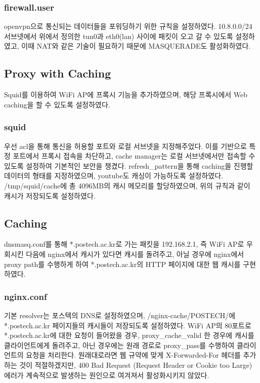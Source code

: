 \documentclass{article}
\begin{document}
    \subsubsection{firewall.user}
    openvpn으로 통신되는 데이터들을 포워딩하기 위한 규칙을 설정하였다. 10.8.0.0/24 서브넷에서 위에서 정의한 tun0과 eth0(lan) 사이에 패킷이 오고 갈 수 있도록 설정하였고,
    이때 NAT와 같은 기술이 필요하기 때문에 MASQUERADE도 활성화하였다.

    \subsection{Proxy with Caching}
    Squid를 이용하여 WiFi AP에 프록시 기능을 추가하였으며, 해당 프록시에서 Web caching을 할 수 있도록 설정하였다.
    \subsubsection{squid}
    우선 acl을 통해 통신을 허용할 포트와 로컬 서브넷을 지정해주었다.
    이를 기반으로 특정 포트에서 프록시 접속을 차단하고, cache manager는 로컬 서브넷에서만 접속할 수 있도록 설정하여 기본적인 보안을 챙겼다.
    refresh\_pattern을 통해 caching을 진행할 데이터의 형태를 지정하였으며, youtube도 캐싱이 가능하도록 설정하였다.
    /tmp/squid/cache에 총 4096MB의 캐시 메모리를 할당하였으며, 위의 규칙과 같이 캐시가 저장되도록 설정하였다.


    \subsection{Caching}
    dnsmasq.conf를 통해 *.postech.ac.kr로 가는 패킷을 192.168.2.1, 즉 WiFi AP로 우회시킨 다음에 nginx에서 캐시가 있다면 캐시를 돌려주고,
    아닐 경우에 nginx에서 proxy path를 수행하게 하여 *.postech.ac.kr의 HTTP 페이지에 대한 웹 캐시를 구현하였다.
    \subsubsection{nginx.conf}
    기본 resolver는 포스텍의 DNS로 설정하였으며, /nginx-cache/POSTECH/에 *.postech.ac.kr 페이지들의 캐시들이 저장되도록 설정하였다.
    WiFi AP의 80포트로 *.postech.ac.kr에 대한 요청이 들어왔을 경우, proxy\_cache\_valid 한 경우에 캐시를 클라이언트에게 돌려주고,
    아닌 경우에는 원래 경로로 proxy\_pass를 수행하여 클라이언트의 요청을 처리한다.
    원래대로라면 웹 규약에 맞게 X-Forwarded-For 헤더를 추가하는 것이 적절하겠지만,
    400 Bad Request (Request Header or Cookie too Large) 에러가 계속적으로 발생하는 원인으로 여겨져서 활성화시키지 않았다.
\end{document}
